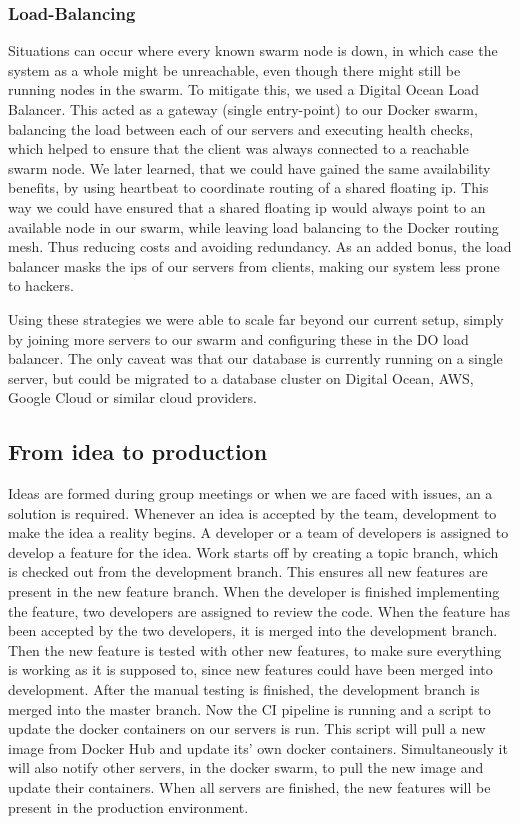 \subsubsection{Load-Balancing}
Situations can occur where every known swarm node is down, in which case the system as a whole might be unreachable, even though there might still be running nodes in the swarm.
\newline
To mitigate this, we used a Digital Ocean Load Balancer. This acted as a gateway (single entry-point) to our Docker swarm, balancing the load between each of our servers and executing health checks, which helped to ensure that the client was always connected to a reachable swarm node.
\newline
We later learned, that we could have gained the same availability benefits, by using heartbeat to coordinate routing of a shared floating ip.
This way we could have ensured that a shared floating ip would always point to an available node in our swarm, while leaving load balancing to the Docker routing mesh. Thus reducing costs and avoiding redundancy.
\newline
As an added bonus, the load balancer masks the ips of our servers from clients, making our system less prone to hackers.

Using these strategies we were able to scale far beyond our current setup, simply by joining more servers to our swarm and configuring these in the DO load balancer.
The only caveat was that our database is currently running on a single server, but could be migrated to a database cluster on Digital Ocean, AWS, Google Cloud or similar cloud providers.

\subsection{From idea to production}

Ideas are formed during group meetings or when we are faced with issues, an a solution is required.
Whenever an idea is accepted by the team, development to make the idea a reality begins. A developer or a team of developers is assigned to develop a feature for the idea. Work starts off by creating a topic branch, which is checked out from the development branch. This ensures all new features are present in the new feature branch. When the developer is finished implementing the feature, two developers are assigned to review the code. When the feature has been accepted by the two developers, it is merged into the development branch. Then the new feature is tested with other new features, to make sure everything is working as it is supposed to, since new features could have been merged into development. After the manual testing is finished, the development branch is merged into the master branch. Now the CI pipeline is running and a script to update the docker containers on our servers is run. This script will pull a new image from Docker Hub and update its' own docker containers. Simultaneously it will also notify other servers, in the docker swarm, to pull the new image and update their containers. When all servers are finished, the new features will be present in the production environment.
